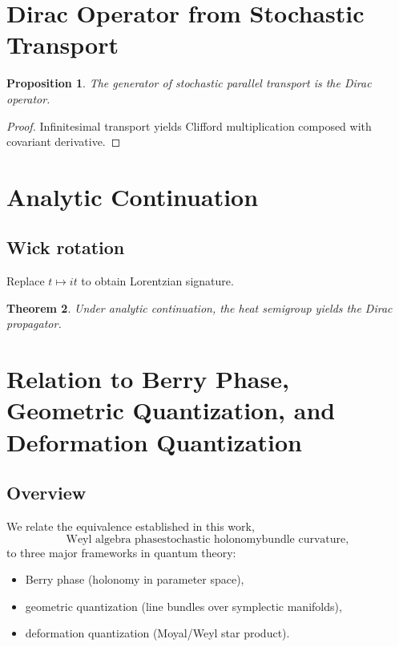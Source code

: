 \documentclass[11pt]{article}
\newtheorem{theorem}{Theorem}[section]
\newtheorem{proposition}[theorem]{Proposition}
\begin{document}
\section{Dirac Operator from Stochastic Transport}

\begin{proposition}
The generator of stochastic parallel transport is the Dirac operator.
\end{proposition}

\begin{proof}
Infinitesimal transport yields Clifford multiplication composed with covariant derivative.
\end{proof}

\section{Analytic Continuation}

\subsection{Wick rotation}

Replace $t \mapsto it$ to obtain Lorentzian signature.

\begin{theorem}
Under analytic continuation, the heat semigroup yields the Dirac propagator.
\end{theorem}


\section{Relation to Berry Phase, Geometric Quantization, and Deformation Quantization}

\subsection{Overview}

We relate the equivalence established in this work,
\[
\text{Weyl algebra phase}
 \text{stochastic holonomy}
\text{bundle curvature},
\]
to three major frameworks in quantum theory:

\begin{itemize}
\item Berry phase (holonomy in parameter space),
\item geometric quantization (line bundles over symplectic manifolds),
\item deformation quantization (Moyal/Weyl star product).
\end{itemize}
\end{document}

